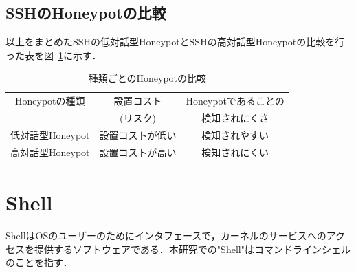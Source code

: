 \subsection{SSHのHoneypotの比較}
\label{tech:CompareHoneypot}
以上をまとめたSSHの低対話型HoneypotとSSHの高対話型Honeypotの比較を行った表を図~\ref{table:compare}に示す．


\vspace{5mm}
\newlength{\myheight}
\setlength{\myheight}{10mm}
\begin{table}[h]
 \caption{種類ごとのHoneypotの比較}
 \label{table:compare}
 \centering
  \begin{tabular}{|c||c|c|}
   \hline
   \parbox[c][\myheighta][c]{0cm}{}Honeypotの種類 & 設置コスト & Honeypotであることの \\
   \parbox[c][\myheighta][c]{0cm}{} & (リスク) & 検知されにくさ \\
   \hline \hline
     \parbox[c][\myheight][c]{0cm}{} 低対話型Honeypot  & 設置コストが低い & 検知されやすい \\
     \hline
     \parbox[c][\myheight][c]{0cm}{} 高対話型Honeypot  & 設置コストが高い & 検知されにくい \\
     \hline
  \end{tabular}
\end{table}
\vspace{5mm}



\section{Shell}
\label{tech:Shell}
ShellはOSのユーザーのためにインタフェースで，カーネルのサービスへのアクセスを提供するソフトウェアである．本研究での"Shell"はコマンドラインシェルのことを指す．

